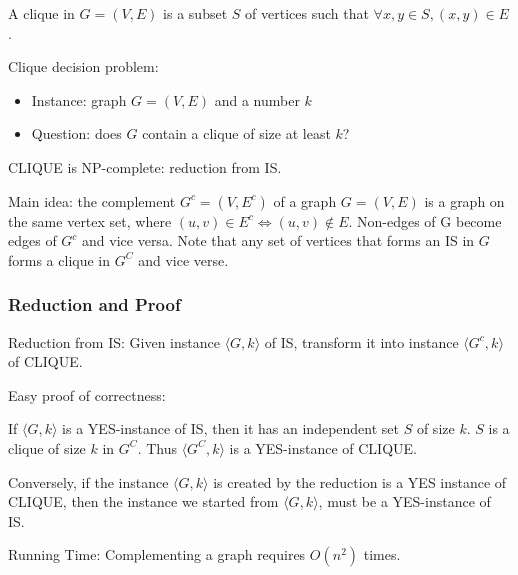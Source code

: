 A clique in $G=(V,E)$ is a subset $S$ of vertices such that $\forall x,y \in S, (x,y) \in E$.

Clique decision problem:
\begin{itemize}
	\item Instance: graph $G=(V, E)$ and a number $k$
	\item Question: does $G$ contain a clique of size at least $k$?
\end{itemize}

CLIQUE is NP-complete: reduction from IS.

Main idea: the complement $G^c=(V,E^c)$ of a graph $G=(V,E)$ is a graph on the same vertex set, where $(u,v) \in E^c \iff (u,v) \notin E$. Non-edges of G become edges of $G^c$ and vice versa. Note that any set of vertices that forms an IS in $G$ forms a clique in $G^C$ and vice verse.

\subsubsection{Reduction and Proof}
Reduction from IS: Given instance $\langle G,k \rangle$ of IS, transform it into instance $\langle G^c,k \rangle$ of CLIQUE.

Easy proof of correctness:

If $\langle G, k\rangle$ is a YES-instance of IS, then it has an independent set $S$ of size $k$. $S$ is a clique of size $k$ in $G^C$. Thus $\langle G^C, k \rangle$ is a YES-instance of CLIQUE. 

Conversely, if the instance $\langle G, k\rangle$ is created by the reduction is a YES instance of CLIQUE, then the instance we started from $\langle G, k \rangle$, must be a YES-instance of IS.

Running Time: Complementing a graph requires $O(n^2)$ times.








































